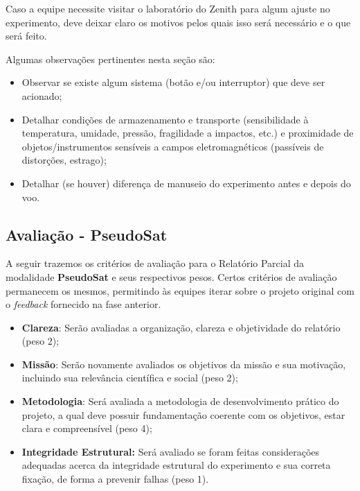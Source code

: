             Caso a equipe necessite visitar o laboratório do Zenith para algum ajuste no experimento, deve deixar claro os motivos pelos quais isso será necessário e o que será feito.
            
            Algumas observações pertinentes nesta seção são:
            \begin{itemize}
                \item Observar se existe algum sistema (botão e/ou interruptor) que deve ser acionado; 
                \item Detalhar condições de armazenamento e transporte (sensibilidade à temperatura, umidade, pressão, fragilidade a impactos, etc.) e proximidade de objetos/instrumentos sensíveis a campos eletromagnéticos (passíveis de distorções, estrago);
                \item Detalhar (se houver) diferença de manuseio do experimento antes e depois do voo.
            \end{itemize}

    \subsection{Avaliação - PseudoSat}
        A seguir trazemos os critérios de avaliação para o Relatório Parcial da modalidade \textbf{PseudoSat} e seus respectivos pesos. Certos critérios de avaliação permanecem os mesmos, permitindo às equipes iterar sobre o projeto original com o \textit{feedback} fornecido na fase anterior.
        
        \begin{itemize}
            \item \textbf{Clareza}: Serão avaliadas a organização, clareza e objetividade do relatório (peso 2);
                     
            \item \textbf{Missão}: Serão novamente avaliados os objetivos da missão e sua motivação, incluindo sua relevância científica e social (peso 2);
            
            \item \textbf{Metodologia}: Será avaliada a metodologia de desenvolvimento prático do projeto, a qual deve possuir fundamentação coerente com os objetivos, estar clara e compreensível (peso 4);

            \item \textbf{Integridade Estrutural:} Será avaliado se foram feitas considerações adequadas acerca da integridade estrutural do experimento e sua correta fixação, de forma a prevenir falhas (peso 1).
        \end{itemize}
        
